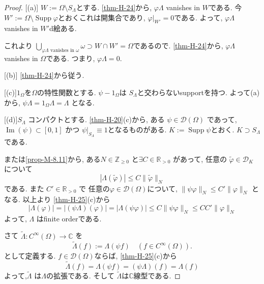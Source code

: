 \begin{proof}

[(a)]
 \(W := \Omega \setminus S_\Lambda\)とする. 
 \ref{thm-H-24}から,  \(\varphi \Lambda\) vanishes in \(W\)である. 
 今\(W' := \Omega \setminus \operatorname{Supp}\varphi\)とおくこれは開集合であり,  \(\varphi|_{W'} = 0\)である. 
 よって,  \(\varphi \Lambda\) vanishes in \(W'\)d絵ある. 

これより \(\bigcup_{\varphi \Lambda \text{ vanishes in } \omega} \omega \supset W \cap W' = \Omega\)であるので. 
 \ref{thm-H-24}から,   \(\varphi \Lambda\) vanishes in \(\Omega\)である. つまり, \(\varphi \Lambda = 0\).

[(b)]  \ref{thm-H-24}から従う.

[(c)]$1_{\Omega}$を$\Omega$の特性関数とする. 
 \(\psi - 1_\Omega\)は \(S_\Lambda\)と交わらないsupportを持つ. 
 よって(a)から, \(\psi \Lambda = 1_\Omega \Lambda = \Lambda\) となる.
  
[(d)]\(S_\Lambda\) コンパクトとする. 
\ref{thm-H-20}(c)から, 
ある \( \psi \in \mathcal{D}(\Omega)\) であって, 
 \(\operatorname{Im}(\psi) \subset [0,1]\) かつ \(\psi|_{S_\Lambda} \equiv 1\)となるものがある. 
\(K := \operatorname{Supp}\psi\)とおく. $K\supset S_\Lambda$である.  

\cite[Thm 6.8]{Rud}または\ref{prop-M-8.11}から,
ある\(N \in \mathbb{Z}_{\ge 0}\) と\(\exists C \in \mathbb{R}_{>0}\) があって, 任意の
$\tilde{\varphi} \in \mathcal{D}_K$について
\[
|\Lambda(\tilde{\varphi})| \le C \|\tilde{\varphi}\|_N
 \]
である. 
また \(C' \in \mathbb{R}_{>0}\) で 任意の\(\varphi \in \mathcal{D}(\Omega)\)について, 
\(\|\psi \varphi\|_N \le C' \|\varphi\|_N \) となる. 
以上より \ref{thm-H-25}(c)から
\[
|\Lambda(\varphi)| 
= 
|(\psi \Lambda)(\varphi)| 
= |\Lambda(\psi \varphi)| 
\le C \|\psi \varphi\|_N 
\le CC' \|\varphi\|_N
\]  
よって,  \(\Lambda\) はfinite orderである. 

さて \(\tilde{\Lambda}: C^\infty(\Omega) \to \mathbb{C}\) を
\[
\tilde{\Lambda}(f) := \Lambda(\psi f) \quad (f \in C^\infty(\Omega)).
\]
として定義する. 
 \(f \in \mathcal{D}(\Omega)\)ならば, \ref{thm-H-25}(c)から
\[
\tilde{\Lambda}(f) = \Lambda(\psi f) = (\psi \Lambda)(f) = \Lambda(f) 
\]  
よって,\(\tilde{\Lambda}\) は\(\Lambda\)の拡張である.
そして \(\tilde{\Lambda}\)は$\mathbb{C}$線型である.  


\end{proof}
